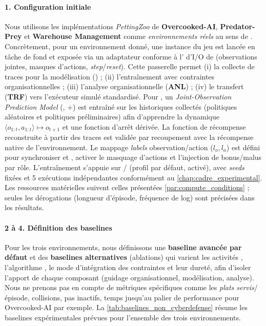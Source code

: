 \paragraph{1. Configuration initiale}

Nous utilisons les implémentations \emph{PettingZoo} de \phantom{X} \textbf{Overcooked-AI}, \textbf{Predator-Prey} et \textbf{Warehouse Management} comme \emph{environnements réels} au sens de . Concrètement, pour un environnement donné, une instance du jeu est lancée en tâche de fond et exposée via un adaptateur  conforme à l' d'I/O de  (observations jointes, masques d'actions, \emph{step}/\emph{reset}). Cette passerelle permet (i) la collecte de traces pour la modélisation () ; (ii) l'entraînement  avec contraintes organisationnelles ; (iii) l'analyse organisationnelle (\textbf{ANL}) ; (iv) le transfert (\textbf{TRF}) vers l'exécuteur simulé standardisé.
Pour , un \emph{Joint-Observation Prediction Model} (, +) est entraîné sur les historiques collectés (politiques aléatoires et politiques préliminaires) afin d'apprendre la dynamique $\langle o_{1:t},a_{1:t} \rangle \mapsto o_{t+1}$ et une fonction d'arrêt dérivée. La fonction de récompense reconstruite à partir des traces est validée par recoupement avec la récompense native de l'environnement. Le mappage \emph{labels} observation/action ($l_o, l_a$) est défini pour synchroniser  et , activer le masquage d'actions et l'injection de bonus/malus par rôle. L'entraînement s'appuie sur / (profil  par défaut,  activé), avec \textit{seeds} fixées et 5 exécutions indépendantes conformément au \autoref{chap:cadre_experimental}. Les ressources matérielles suivent celles présentées \autoref{par:compute_conditions} ; seules les dérogations (longueur d'épisode, fréquence de log) sont précisées dans les résultats.

\paragraph{2 à 4. Définition des baselines}

Pour les trois environnements, nous définissons une \textbf{baseline avancée par défaut} et des \textbf{baselines alternatives} (ablations) qui varient les activités , l'algorithme , le mode d'intégration des contraintes et leur dureté, afin d'isoler l'apport de chaque composant (guidage organisationnel, modélisation, analyse). Nous ne prenons pas en compte de métriques spécifiques comme les \emph{plats servis}/épisode, collisions, pas inactifs, temps jusqu'au palier de performance pour Overcooked-AI par exemple. La \autoref{tab:baselines_non_cyberdefense} résume les baselines expérimentales prévues pour l'ensemble des trois environnements.


